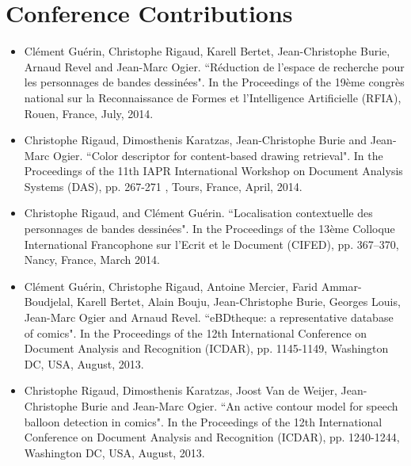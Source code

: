 \section*{Conference Contributions}

\begin{itemize}

\item Cl{\'e}ment Gu{\'e}rin, Christophe Rigaud, Karell Bertet, Jean-Christophe Burie, Arnaud Revel and Jean-Marc Ogier. ``R{\'e}duction de l'espace de recherche pour les personnages de bandes dessin{\'e}es". In the Proceedings of the 19{\`e}me congr{\`e}s national sur la Reconnaissance de Formes et l'Intelligence Artificielle (RFIA), Rouen, France, July, 2014.
\vspace*{.3cm}

\item Christophe Rigaud, Dimosthenis Karatzas, Jean-Christophe Burie and Jean-Marc Ogier. ``Color descriptor for content-based drawing retrieval". In the Proceedings of the 11th IAPR International Workshop on Document Analysis Systems (DAS), pp. 267-271 , Tours, France, April, 2014.
\vspace*{.3cm}

\item Christophe Rigaud, and Cl{\'e}ment Gu{\'e}rin. ``Localisation contextuelle des personnages de bandes dessinées". In the Proceedings of the 13{\`e}me Colloque International Francophone sur l'Ecrit et le Document (CIFED), pp. 367–370, Nancy, France, March 2014.
\vspace*{.3cm}

\item Cl{\'e}ment Gu{\'e}rin, Christophe Rigaud, Antoine Mercier, Farid Ammar-Boudjelal, Karell Bertet, Alain Bouju, Jean-Christophe Burie, Georges Louis, Jean-Marc Ogier and Arnaud Revel. ``eBDtheque: a representative database of comics". In the Proceedings of the 12th International Conference on Document Analysis and Recognition (ICDAR), pp. 1145-1149, Washington DC, USA, August, 2013.
\vspace*{.3cm}

\item Christophe Rigaud, Dimosthenis Karatzas, Joost Van de Weijer, Jean-Christophe Burie and Jean-Marc Ogier. ``An active contour model for speech balloon detection in comics". In the Proceedings of the 12th International Conference on Document Analysis and Recognition (ICDAR), pp. 1240-1244, Washington DC, USA, August, 2013.
\vspace*{.3cm}


\end{itemize}
